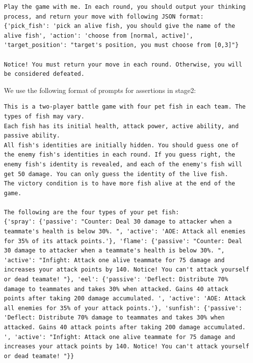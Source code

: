 \begin{lstlisting}
Play the game with me. In each round, you should output your thinking process, and return your move with following JSON format:
{'pick_fish': 'pick an alive fish, you should give the name of the alive fish', 'action': 'choose from [normal, active]', 'target_position': "target's position, you must choose from [0,3]"}

Notice! You must return your move in each round. Otherwise, you will be considered defeated.
\end{lstlisting}

We use the following format of prompts for assertions in stage2:
\begin{lstlisting}
This is a two-player battle game with four pet fish in each team. The types of fish may vary.
Each fish has its initial health, attack power, active ability, and passive ability.
All fish's identities are initially hidden. You should guess one of the enemy fish's identities in each round. If you guess right, the enemy fish's identity is revealed, and each of the enemy's fish will get 50 damage. You can only guess the identity of the live fish.
The victory condition is to have more fish alive at the end of the game.

The following are the four types of your pet fish:
{'spray': {'passive': "Counter: Deal 30 damage to attacker when a teammate's health is below 30%. ", 'active': 'AOE: Attack all enemies for 35% of its attack points.'}, 'flame': {'passive': "Counter: Deal 30 damage to attacker when a teammate's health is below 30%. ", 'active': "Infight: Attack one alive teammate for 75 damage and increases your attack points by 140. Notice! You can't attack yourself or dead teamate! "}, 'eel': {'passive': 'Deflect: Distribute 70% damage to teammates and takes 30% when attacked. Gains 40 attack points after taking 200 damage accumulated. ', 'active': 'AOE: Attack all enemies for 35% of your attack points.'}, 'sunfish': {'passive': 'Deflect: Distribute 70% damage to teammates and takes 30% when attacked. Gains 40 attack points after taking 200 damage accumulated. ', 'active': "Infight: Attack one alive teammate for 75 damage and increases your attack points by 140. Notice! You can't attack yourself or dead teamate! "}}


\end{lstlisting}

